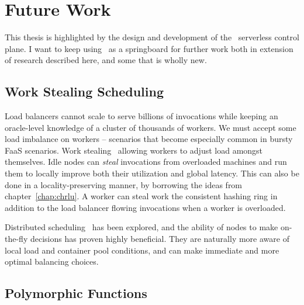 \section{Future Work}
\label{sec:future}

This thesis is highlighted by the design and development of the \sysname~serverless control plane.
I want to keep using \sysname~as a springboard for further work both in extension of research described here, and some that is wholly new.

\subsection{Work Stealing Scheduling}
\label{sec:work-steal}

Load balancers cannot scale to serve billions of invocations while keeping an oracle-level knowledge of a cluster of thousands of workers.
We must accept some load imbalance on workers -- scenarios that become especially common in bursty FaaS scenarios.
Work stealing~\cite{lin2020efficient, guo2010slaw, blumofe1999scheduling} allowing workers to adjust load amongst themselves.
Idle nodes can \emph{steal} invocations from overloaded machines and run them to locally improve both their utilization and global latency.
This can also be done in a locality-preserving manner, by borrowing the ideas from chapter~\ref{chap:chrlu}.
A worker can steal work  the consistent hashing ring in addition to the load balancer flowing invocations  when a worker is overloaded.

Distributed scheduling~\cite{tang2022distributed,exton2024raptor} has been explored, and the ability of nodes to make on-the-fly decisions has proven highly beneficial.
They are naturally more aware of local load and container pool conditions, and can make immediate and more optimal balancing choices.


\subsection{Polymorphic Functions}
\label{chap:new-poly}

